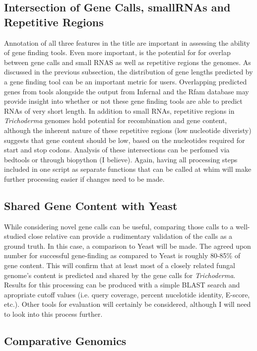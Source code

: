 \documentclass[12pt]{article}
\begin{document}
\subsection{Intersection of Gene Calls, smallRNAs and Repetitive Regions}

Annotation of all three features in the title are important in
assessing the ability of gene finding tools. Even more important, is
the potential for for overlap between gene calls and small RNAS as
well as repetitive regions the genomes. As discussed in the previous
subsection, the distribution of gene lengths predicted by a gene
finding tool can be an important metric for users. Overlapping
predicted genes from tools alongside the output from Infernal and the
Rfam database may provide insight into whether or not these gene
finding tools are able to predict RNAs of very short length. In
addition to small RNAs, repetitive regions in \textit{Trichoderma}
genomes hold potential for recombination and gene content, although
the inherent nature of these repetitive regions (low nucleotide
diveristy) suggests that gene content should be low, based on the
nucleotides required for start and stop codons. Analysis of these
intersections can be perfomed via bedtools or through biopython (I
believe). Again, having all processing steps included in one script as
separate functions that can be called at whim will make further
processing easier if changes need to be made.

\subsection{Shared Gene Content with Yeast}

While considering novel gene calls can be useful, comparing those
calls to a well-studied close relative can provide a rudimentary
validation of the calls as a ground truth. In this case, a comparison
to Yeast will be made. The agreed upon number for successful
gene-finding as compared to Yeast is roughly 80-85\% of gene
content. This will confirm that at least most of a closely related
fungal genome's content is predicted and shared by the gene calls for
\textit{Trichoderma}. Results for this processing can be produced with
a simple BLAST search and apropriate cutoff values (i.e. query
coverage, percent nucelotide identity, E-score, etc.). Other tools for
evaluation will certainly be considered, although I will need to look
into this process further.

\subsection{Comparative Genomics}
\end{document}
